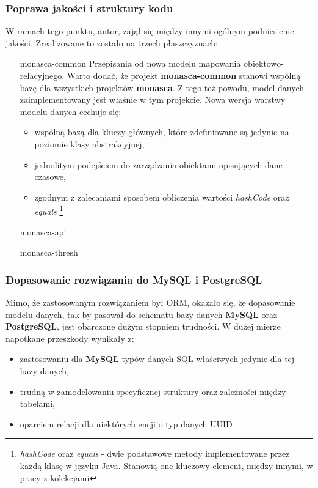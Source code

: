     \subsubsection{Poprawa jakości i struktury kodu}
    W ramach tego punktu, autor, zajął się między innymi ogólnym podniesienie jakości. Zrealizowane to zostało
    na trzech płaszczyznach:
    \begin{itemize}
        \item[monasca-common]
        Przepisania od nowa modelu mapowania obiektowo-relacyjnego. Warto dodać, że projekt \textbf{monasca-common} stanowi
        wspólną bazę dla wszystkich projektów \textbf{monasca}. Z tego też powodu, model danych zaimplementowany jest
        właśnie w tym projekcie. Nowa wersja warstwy modelu danych cechuje się:
        \begin{itemize}
            \item wspólną bazą dla kluczy głównych, które zdefiniowane są jedynie na poziomie klasy abstrakcyjnej,
            \item jednolitym podejściem do zarządzania obiektami opisujących dane czasowe,
            \item zgodnym z zalecaniami sposobem obliczenia wartości \textit{hashCode} oraz \textit{equals}
            \footnote{\textit{hashCode} oraz \textit{equals} - dwie podstawowe metody implementowane przez każdą klasę w języku Java. Stanowią one
                kluczowy element, między innymi, w pracy z kolekcjami}
        \end{itemize}
        \item[monasca-api]
        
        \item[monasca-thresh]
    \end{itemize}
    
    \subsubsection{Dopasowanie rozwiązania do MySQL i PostgreSQL}
    Mimo, że zastosowanym rozwiązaniem był ORM, okazało się, że dopasowanie modelu danych, tak by pasował do 
    schematu bazy danych \textbf{MySQL} oraz \textbf{PostgreSQL}, jest obarczone dużym stopniem trudności. 
    W dużej mierze napotkane przeszkody wynikały z:
    \begin{itemize}
        \item zastosowaniu dla \textbf{MySQL} typów danych SQL właściwych jedynie dla tej bazy danych,
        \item trudną w zamodelowaniu specyficznej struktury oraz zależności między tabelami,
        \item oparciem relacji dla niektórych encji o typ danych UUID
    \end{itemize}
    
